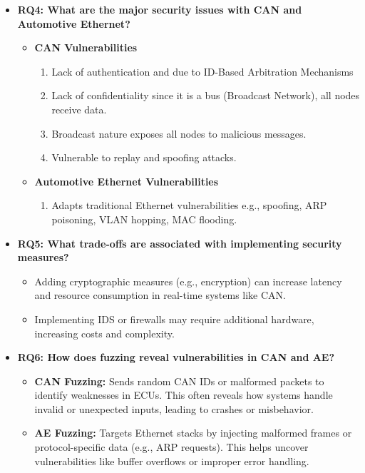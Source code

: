 \documentclass{report}
\begin{document}
\begin{itemize}
    \item \textbf{RQ4: What are the major security issues with CAN and Automotive Ethernet?}
        \begin{itemize}
            \item \textbf{CAN Vulnerabilities}
            \begin{enumerate}
                \item Lack of authentication and due to ID-Based Arbitration Mechanisms
                \item Lack of confidentiality since it is a bus (Broadcast Network), all nodes receive data.
                \item Broadcast nature exposes all nodes to malicious messages.
                \item Vulnerable to replay and spoofing attacks.
            \end{enumerate}
        
            \item \textbf{Automotive Ethernet Vulnerabilities}
            \begin{enumerate}
                \item Adapts traditional Ethernet vulnerabilities e.g., spoofing, ARP poisoning, VLAN hopping, MAC flooding.
            \end{enumerate}
        \end{itemize}
        
    \item \textbf{RQ5: What trade-offs are associated with implementing security measures?}
        \begin{itemize}
            \item Adding cryptographic measures (e.g., encryption) can increase latency and resource consumption in real-time systems like CAN.
            \item Implementing IDS or firewalls may require additional hardware, increasing costs and complexity.
        \end{itemize}
        
    \item \textbf{RQ6: How does fuzzing reveal vulnerabilities in CAN and AE?}
        \begin{itemize}
            \item \textbf{CAN Fuzzing:} Sends random CAN IDs or malformed packets to identify weaknesses in ECUs. This often reveals how systems handle invalid or unexpected inputs, leading to crashes or misbehavior.
            \item \textbf{AE Fuzzing:} Targets Ethernet stacks by injecting malformed frames or protocol-specific data (e.g., ARP requests). This helps uncover vulnerabilities like buffer overflows or improper error handling.
        \end{itemize}
        
\end{itemize}
\end{document}
